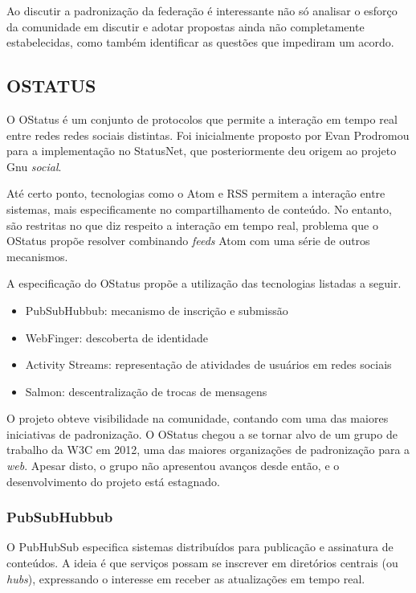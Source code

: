 Ao discutir a padronização da federação é interessante não só analisar o esforço da
comunidade em discutir e adotar propostas ainda não completamente estabelecidas,
como também identificar as questões que impediram um acordo.


\subsection{OSTATUS}

O OStatus é um conjunto de protocolos que permite a interação em tempo real entre
redes redes sociais distintas. Foi inicialmente proposto por Evan Prodromou para a
implementação no StatusNet, que posteriormente deu origem ao projeto Gnu
\textit{social}.

Até certo ponto, tecnologias como o Atom e RSS permitem a interação entre sistemas,
mais especificamente no compartilhamento de conteúdo. No entanto, são restritas no
que diz respeito a interação em tempo real, problema que o OStatus propõe resolver
combinando \textit{feeds} Atom com uma série de outros mecanismos.

A especificação do OStatus propõe a utilização das tecnologias listadas a seguir.

\begin{itemize}
  \item{PubSubHubbub: mecanismo de inscrição e submissão}
  \item{WebFinger: descoberta de identidade}
  \item{Activity Streams: representação de atividades de usuários em redes sociais}
  \item{Salmon: descentralização de trocas de mensagens}
\end{itemize}

O projeto obteve visibilidade na comunidade, contando com uma das maiores
iniciativas de padronização. O OStatus chegou a se tornar alvo de um grupo de
trabalho da W3C em 2012, uma das maiores organizações de padronização para a
\textit{web}. Apesar disto, o grupo não apresentou avanços desde então, e o
desenvolvimento do projeto está estagnado.

\subsubsection{PubSubHubbub}

O PubHubSub especifica sistemas distribuídos para publicação e assinatura de
conteúdos. A ideia é que serviços possam se inscrever em diretórios centrais (ou
\textit{hubs}), expressando o interesse em receber as atualizações em tempo real.

